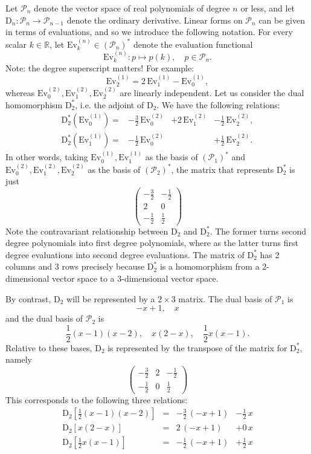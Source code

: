 \documentclass[12pt]{article}
\newcommand{\dual}{^*}
\newcommand{\cP}[1]{\mathcal{P}_{#1}}
\newcommand{\ev}[1]{\mathrm{Ev}^{(#1)}}
\newcommand{\D}[1]{\mathrm{D}_{#1}}
\newcommand{\reals}{\mathbb{R}}
\newcommand{\lp}{\left(}
\newcommand{\rp}{\right)}
\newcommand{\lb}{\left[}
\newcommand{\rb}{\right]}
\begin{document}
Let $\cP{n}$ denote the vector space of real
polynomials of degree $n$ or less, and let $\D{n}:\cP{n}\rightarrow
\cP{n-1}$ denote the ordinary derivative.  Linear forms on $\cP{n}$
can be given in terms of evaluations, and so we introduce the
following notation.  For every scalar $k\in\reals$, let $\ev{n}_k\in
(\cP{n})\dual$ denote the evaluation functional
$$\ev{n}_k:p\mapsto p(k),\quad p\in \cP{n}.$$
Note: the degree superscript matters!  For example:
$$\ev1_2 = 2\, \ev1_1- \ev1_0,$$
whereas $\ev2_0, \ev2_1, \ev2_2$ are
linearly independent.  Let us consider the dual homomorphism
$\D2\dual$, i.e. the adjoint of $\D2$.  We have the following
relations:
$$
\begin{array}{rrrr}
  \D2\dual\lp\ev1_0\rp =&-\frac{3}{2}\,
  \ev2_0 &+ 2\,\ev2_1 & -\frac{1}{2}\, \ev2_2 ,\\ 
  \D2\dual\lp \ev1_1\rp =& - \frac{1}{2}\, \ev2_0  &&+\frac{1}{2}\, \ev2_2.
\end{array}
$$
In other words, taking $\ev1_0, \ev1_1$ as the basis of
$(\cP1)\dual$ and $\ev2_0, \ev2_1, \ev2_2$ as the basis  of
$(\cP2)\dual$, the matrix that represents $\D2\dual$ is just
$$
\lp
\begin{array}{rr}
  -\frac{3}{2} & - \frac{1}{2} \\
  2 &  0 \\
 - \frac{1}{2} &  \frac{1}{2}
\end{array}\rp
$$
Note the contravariant relationship between $\D2$ and $\D2\dual$. The
former turns second degree polynomials into first degree polynomials,
where as the latter turns first degree evaluations into second degree
evaluations.  The matrix of $\D2\dual$ has 2 columns and 3 rows
precisely because $\D2\dual$ is a homomorphism from a 2-dimensional
vector space to a 3-dimensional vector space.  

By contrast, $\D2$ will be represented by a $2\times 3$ matrix.  The
dual basis of $\cP1$ is
$$-x+1,\quad x$$
and the dual basis of $\cP2$ is
$$\frac{1}{2} (x-1)(x-2),\quad  x(2-x),\quad \frac{1}{2} x(x-1).$$
Relative to these bases, $\D2$ is represented by the transpose of the
matrix for $\D2\dual$, namely
$$
\begin{pmatrix}
  -\frac{3}{2} & 2 & - \frac{1}{2} \\
 - \frac{1}{2} & 0 &  \frac{1}{2}
\end{pmatrix}
$$
This corresponds to the following three relations:
$$
\begin{array}{lcrr}
\D2\lb \frac{1}{2} (x-1)(x-2) \rb &=& -\frac{3}{2}\, (-x+1) &  -
\frac{1}{2}\, x \\
\D2\lb x(2-x) \rb &=& 2\, (-x+1) & + 0\, x \\
\D2\lb \frac{1}{2} x(x-1) \rb &=& - \frac{1}{2}\,(-x+1) & +
\frac{1}{2}\, x
\end{array}
$$
\end{document}
